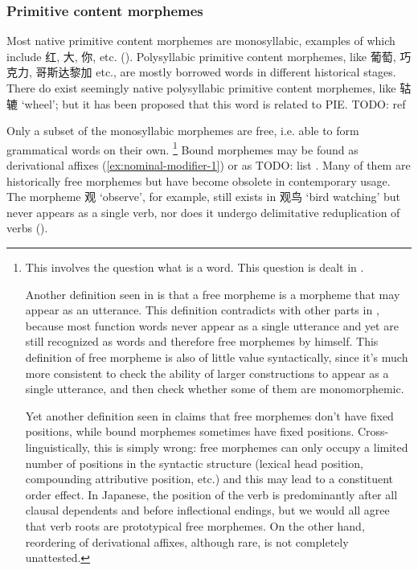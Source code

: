 \documentclass[UTF8, a4paper, oneside, scheme=plain, 12pt]{ctexrep}
\newcommand*{\citesec}[1]{\S~{#1}}
\newcommand*{\citepage}[1]{p.~{#1}}
\newcommand{\translate}[1]{`#1'}
\begin{document}
\subsubsection{Primitive content morphemes}\label{sec:pos.morpheme.primitive}

Most native primitive content morphemes 
are monosyllabic, examples of which include 红, 大, 你, etc.
().
Polysyllabic primitive content morphemes,
like 葡萄, 巧克力, 哥斯达黎加 etc., 
are mostly borrowed words
in different historical stages.
There do exist seemingly native polysyllabic primitive content morphemes,
like 轱辘 \translate{wheel}; 
but it has been proposed that this word is related to PIE. TODO: ref 

Only a subset of the monosyllabic morphemes are free,
i.e. able to form grammatical words
on their own.%
\footnote{
    This involves the question what is a word. 
    This question is dealt in .

    Another definition seen in \citet[\citesec{1.1.2}]{zhudexigrammar}
    is that a free morpheme is a morpheme that may appear as an utterance.
    This definition contradicts with other parts in \citet{zhudexigrammar},
    because most function words never appear as a single utterance
    and yet are still recognized as words
    and therefore free morphemes by himself.
    This definition of free morpheme is also of little value syntactically,
    since it's much more consistent to check the ability of larger constructions to appear 
    as a single utterance, 
    and then check whether some of them are monomorphemic. 

    Yet another definition seen in \citet[\citepage{16}]{zhudexigrammar} claims that 
    free morphemes don't have fixed positions, 
    while bound morphemes sometimes have fixed positions.
    Cross-linguistically, this is simply wrong: 
    free morphemes can only occupy a limited number 
    of positions in the syntactic structure 
    (lexical head position, compounding attributive position, etc.)
    and this may lead to a constituent order effect.
    In Japanese,  
    the position of the verb is predominantly 
    after all clausal dependents and before inflectional endings, 
    but we would all agree that verb roots are prototypical free morphemes.
    On the other hand, reordering of derivational affixes, although rare, 
    is not completely unattested. 
}
Bound morphemes may be found as 
derivational affixes (\ref{ex:nominal-modifier-1}) 
or as TODO: list .
Many of them are historically free morphemes
but have become obsolete in contemporary usage.
The morpheme 观 \translate{observe}, for example,
still exists in 观鸟 \translate{bird watching}
but never appears as a single verb, 
nor does it undergo delimitative reduplication of verbs
().
\end{document}
